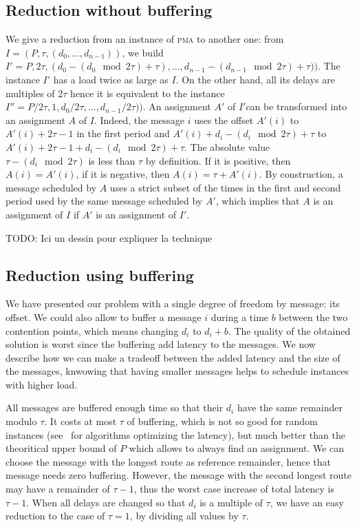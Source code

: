 \documentclass[10pt, conference, letterpaper]{IEEEtran}
\newcommand\pma{\textsc{pma}\xspace}
\newcommand{\todo}[1]{{\color{red} TODO: {#1}}}
\begin{document}
\subsection{Reduction without buffering}

We give a reduction from an instance of \pma to another one:
from $I = (P,\tau,(d_{0},\dots,d_{n-1}))$, we build $I' = P, 2\tau, (d_{0}-(d_{0}\mod 2\tau)+ \tau),\dots,d_{n-1} - (d_{n-1} \mod 2\tau) + \tau))$. The instance $I'$ has a load twice as large as $I$.
On the other hand, all its delays are multiples of $2\tau$ hence it is equivalent to the instance  $I'' = P/2\tau, 1,d_{0}/ 2\tau,\dots,d_{n-1} /2\tau))$. An assignment $A'$ of $I'$can be transformed into an assignment $A$ of $I$. Indeed, the message $i$ uses the offset $A'(i)$
to $A'(i) + 2\tau -1$ in the first period and $A'(i) + d_{i} - (d_{i} \mod 2\tau) + \tau$ to $A'(i) + 2\tau -1+ d_{i} - (d_{i} \mod 2\tau)  + \tau$.  The absolute value $\tau - (d_{i} \mod 2\tau)$ is less than $\tau$ by definition. If it is positive, then $A(i) = A'(i)$, if it is negative, then $A(i) = \tau + A'(i)$. By construction, a message scheduled by $A$ uses a strict subset of the times in the first and second period used by the same message scheduled by $A'$, which implies that $A$ is an assignment of $I$ if $A'$ is an assignment of $I'$. 

\todo{Ici un dessin pour expliquer la technique}


\subsection{Reduction using buffering}

We have presented our problem with a single degree of freedom by message: its
offset. We could also allow to buffer a message $i$ during a time $b$ between the two contention points, which means changing $d_i$ to $d_i + b$. The quality of the obtained solution is worst since the buffering add latency to the messages. We now describe how we can make a tradeoff between the added latency and the size of the messages, knwowing that having smaller messages helps to schedule instances with higher load.


All messages are buffered enough time so that their $d_i$ have the same
remainder modulo $\tau$. It costs at most $\tau$ of buffering, which is not
so good for random instances (see~\cite{barth2018deterministic} for algorithms optimizing the latency), but much better than the theoritical upper bound of $P$ which allows to always find an assignment. We can choose the message with the longest route as reference remainder, hence that message needs zero buffering. However, the message with the second longest route may have a remainder of $\tau -1$, thus the worst case increase of total latency is $\tau -1$. When all delays are changed so that $d_i$ is a multiple of $\tau$, we have an easy reduction to the case of $\tau = 1$, by dividing all values by $\tau$.
\end{document}
